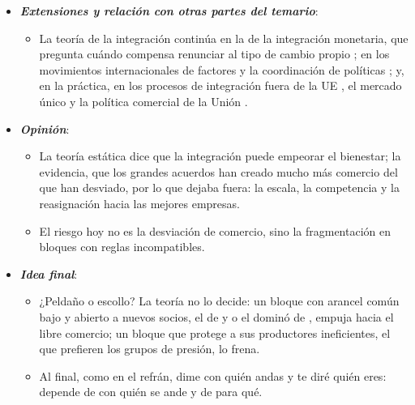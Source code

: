 \documentclass[11pt]{article}
\begin{document}
\begin{itemize}
\begin{itemize}
  \item Aun así, la dificultad de avanzar en la OMC ha hecho de los acuerdos regionales la vía principal de liberalización: el artículo~XXIV los admite como excepción a la nación más favorecida, y hoy hay en vigor 390~acuerdos notificados a la OMC\nocite{OMC2026RTAIS}.
  \end{itemize}
\item \textbf{\emph{Extensiones y relación con otras partes del temario}}:
  \begin{itemize}
  \item La teoría de la integración continúa en la de la integración monetaria, que pregunta cuándo compensa renunciar al tipo de cambio propio ; en los movimientos internacionales de factores  y la coordinación de políticas ; y, en la práctica, en los procesos de integración fuera de la UE , el mercado único  y la política comercial de la Unión .
  \end{itemize}
\item \textbf{\emph{Opinión}}:
  \begin{itemize}
  \item La teoría estática dice que la integración puede empeorar el bienestar; la evidencia, que los grandes acuerdos han creado mucho más comercio del que han desviado, por lo que  dejaba fuera: la escala, la competencia y la reasignación hacia las mejores empresas.

  \item El riesgo hoy no es la desviación de comercio, sino la fragmentación en bloques con reglas incompatibles.
  \end{itemize}
\item \textbf{\emph{Idea final}}:
  \begin{itemize}
  \item ¿Peldaño o escollo? La teoría no lo decide: un bloque con arancel común bajo y abierto a nuevos socios, el de  y  o el dominó de , empuja hacia el libre comercio; un bloque que protege a sus productores ineficientes, el que prefieren los grupos de presión, lo frena.

  \item Al final, como en el refrán, dime con quién andas y te diré quién eres: depende de con quién se ande y de para qué.
  \end{itemize}
\end{itemize}
\end{document}
